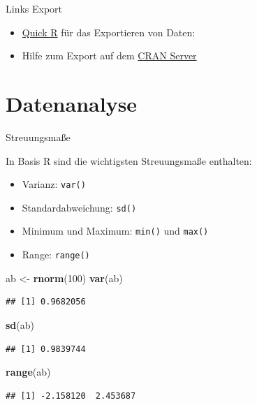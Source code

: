 \documentclass[
  ignorenonframetext,
]{beamer}
\newenvironment{Shaded}{\begin{snugshade}}{\end{snugshade}}
\newcommand{\DecValTok}[1]{\textcolor[rgb]{0.27,0.67,0.26}{#1}}
\newcommand{\KeywordTok}[1]{\textcolor[rgb]{0.26,0.66,0.93}{\textbf{#1}}}
\newcommand{\NormalTok}[1]{\textcolor[rgb]{0.74,0.68,0.62}{#1}}
\newcommand{\StringTok}[1]{\textcolor[rgb]{0.02,0.61,0.04}{#1}}
\providecommand{\tightlist}{%
  \setlength{\itemsep}{0pt}\setlength{\parskip}{0pt}}
\begin{document}
\begin{frame}{Links Export}
\protect\hypertarget{links-export}{}

\begin{itemize}
\item
  \href{http://www.statmethods.net/input/exportingdata.html}{Quick R}
  für das Exportieren von Daten:
\item
  Hilfe zum Export auf dem
  \href{http://cran.r-project.org/doc/manuals/r-release/R-data.pdf}{CRAN
  Server}
\end{itemize}

\end{frame}

\hypertarget{datenanalyse}{%
\section{Datenanalyse}\label{datenanalyse}}

\begin{frame}[fragile]{Streuungsmaße}
\protect\hypertarget{streuungsmae}{}

In Basis R sind die wichtigsten Streuungsmaße enthalten:

\begin{itemize}
\tightlist
\item
  Varianz: \texttt{var()}
\item
  Standardabweichung: \texttt{sd()}
\item
  Minimum und Maximum: \texttt{min()} und \texttt{max()}
\item
  Range: \texttt{range()}
\end{itemize}

\begin{Shaded}
\begin{Highlighting}[]
\NormalTok{ab <-}\StringTok{ }\KeywordTok{rnorm}\NormalTok{(}\DecValTok{100}\NormalTok{)}
\KeywordTok{var}\NormalTok{(ab)}
\end{Highlighting}
\end{Shaded}

\begin{verbatim}
## [1] 0.9682056
\end{verbatim}

\begin{Shaded}
\begin{Highlighting}[]
\KeywordTok{sd}\NormalTok{(ab)}
\end{Highlighting}
\end{Shaded}

\begin{verbatim}
## [1] 0.9839744
\end{verbatim}

\begin{Shaded}
\begin{Highlighting}[]
\KeywordTok{range}\NormalTok{(ab)}
\end{Highlighting}
\end{Shaded}

\begin{verbatim}
## [1] -2.158120  2.453687
\end{verbatim}

\end{frame}
\end{document}
